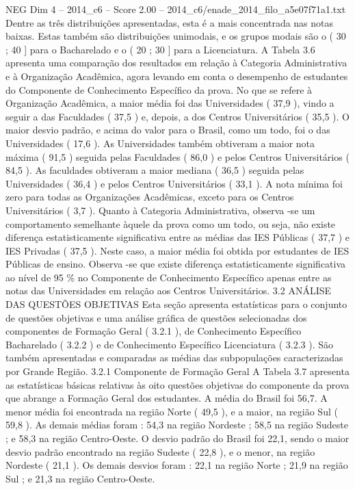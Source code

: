 \begin{textsample}{NEG Dim 4 – 2014\_c6 – Score 2.00 – 2014\_c6/enade\_2014\_filo\_a5e07f71a1.txt}
Dentre as três distribuições apresentadas, esta é a mais concentrada nas notas baixas.
Estas também são distribuições unimodais, e os grupos modais são o ( 30 ; 40 ] para o Bacharelado e o ( 20 ; 30 ] para a Licenciatura.
A Tabela 3.6 apresenta uma comparação dos resultados em relação à Categoria Administrativa e à Organização Acadêmica, agora levando em conta o desempenho de estudantes do Componente de Conhecimento Específico da prova.
No que se refere à Organização Acadêmica, a maior média foi das Universidades ( 37,9 ), vindo a seguir a das Faculdades ( 37,5 ) e, depois, a dos Centros Universitários ( 35,5 ).
O maior desvio padrão, e acima do valor para o Brasil, como um todo, foi o das Universidades ( 17,6 ).
As Universidades também obtiveram a maior nota máxima ( 91,5 ) seguida pelas Faculdades ( 86,0 ) e pelos Centros Universitários ( 84,5 ).
As faculdades obtiveram a maior mediana ( 36,5 ) seguida pelas Universidades ( 36,4 ) e pelos Centros Universitários ( 33,1 ).
A nota mínima foi zero para todas as Organizações Acadêmicas, exceto para os Centros Universitários ( 3,7 ).
Quanto à Categoria Administrativa, observa -se um comportamento semelhante àquele da prova como um todo, ou seja, não existe diferença estatisticamente significativa entre as médias das IES Públicas ( 37,7 ) e IES Privadas ( 37,5 ).
Neste caso, a maior média foi obtida por estudantes de IES Públicas de ensino.
Observa -se que existe diferença estatisticamente significativa ao nível de 95 \% no Componente de Conhecimento Específico apenas entre as notas das Universidades em relação aos Centros Universitários. 3.2 ANÁLISE DAS QUESTÕES OBJETIVAS Esta seção apresenta estatísticas para o conjunto de questões objetivas e uma análise gráfica de questões selecionadas dos componentes de Formação Geral ( 3.2.1 ), de Conhecimento Específico Bacharelado ( 3.2.2 ) e de Conhecimento Específico Licenciatura ( 3.2.3 ).
São também apresentadas e comparadas as médias das subpopulações caracterizadas por Grande Região. 3.2.1 Componente de Formação Geral A Tabela 3.7 apresenta as estatísticas básicas relativas às oito questões objetivas do componente da prova que abrange a Formação Geral dos estudantes.
A média do Brasil foi 56,7.
A menor média foi encontrada na região Norte ( 49,5 ), e a maior, na região Sul ( 59,8 ).
As demais médias foram : 54,3 na região Nordeste ; 58,5 na região Sudeste ; e 58,3 na região Centro-Oeste.
O desvio padrão do Brasil foi 22,1, sendo o maior desvio padrão encontrado na região Sudeste ( 22,8 ), e o menor, na região Nordeste ( 21,1 ).
Os demais desvios foram : 22,1 na região Norte ; 21,9 na região Sul ; e 21,3 na região Centro-Oeste.

\end{textsample}
